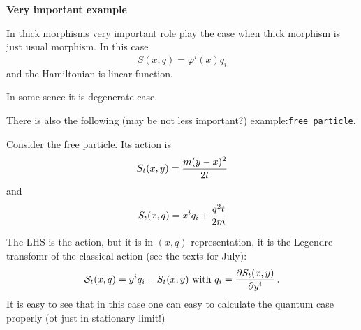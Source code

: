 

\baselineskip=14pt
\def\vare {\varepsilon}
\def\t {\tilde}
\def\a {\alpha}
\def\K {{\bf K}}
\def\N {{\bf N}}
\def\C {{\bf C}}
\def\L {{\cal L}}
\def\E {{\bf E}}
\def\s {{\sigma}}
\def\S {{\cal S}}
\def\SS {{\Sigma}}
\def\p{\partial}
\def\vare{{\varepsilon}}
\def\Q {{\bf Q}}
\def\D {{\cal D}}
\def\G {{\Gamma}}
\def\Z {{\bf Z}}
\def\R  {{\bf R}}
\def\l {\lambda}
\def\ll {{\bf l}}
\def\degree {{\bf {\rm degree}\,\,}}
\def \finish {${\,\,\vrule height1mm depth2mm width 8pt}$}
\def \m {\medskip}
\def\p {\partial}
\def\r {{\bf r}}
\def\pt {{\bf p}}
\def\v {{\bf v}}
\def\n {{\bf n}}
\def\t {{\bf t}}
\def\b {{\bf b}}
\def\c {{\bf c }}
\def\e{{\bf e}}
\def\f{{\bf f}}
\def\ac {{\bf a}}
\def \X   {{\bf X}}
\def \Y   {{\bf Y}}
\def \x   {{\bf x}}
\def \y   {{\bf y}}
\def\w {{\omega}}
\def \Tr  {{\rm Tr\,}}
\def\dim {{\rm dim\,\,}}
\def\t {{\tilde}} 
\def\dist {{\hbox{\tt "distance"}}}
\def  \dim {{\rm dim\,}}
\def  \Im  {{\rm Im\,}}
\def  \ker {{\rm ker\,}}


\def \Cl {\hbox{\tt Cliff}}

\centerline {\bf Very important example}

In thick morphisms very important role  play the
case when thick morphism is just usual  morphism.
In this case
      $$
S(x,q)=\varphi^i(x)q_i
      $$
and the Hamiltonian is linear function.
 
In some sence it is degenerate case.

  There is also the following (may be not less
important?) example:{\tt free particle}.

Consider the free particle. Its action is
      $$
S_t(x,y)={m(y-x)^2\over 2t}
      $$
and 
      $$
S_t(x,q)=x^iq_i+{q^2t\over 2m}
       $$

The LHS is the action, but it is in
$(x,q)$-representation, it is  the Legendre
transfomr of the classical action 
(see the texts for July):
        $$
   \S_t(x,q)= y^i q_i-S_t(x,y)\,\, \hbox {with}\,\,
       q_i={\p S_t(x,y)\over \p y^i}\,.
        $$
It is easy to see that in this case one can easy to
calculate  the quantum case properly 
(ot just in stationary limit!)

